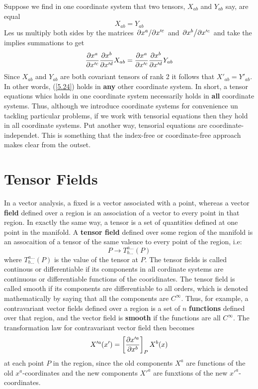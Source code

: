 Suppose we find in one coordinate system that two tensors, $X_{ab}$ and $Y_{ab}$ say, are equal 
\begin{equation}\label{5.24}
  X_{ab}=Y_{ab}
\end{equation}
Les us multiply both sides by the matrices $\pdv*{x^{a}}{x'^c}$ and $\pdv*{x^b}{x'^c}$ and take the implies summations to get
\begin{equation*}
  \pdv{x^{a}}{x'^c}\pdv{x^b}{x'^d}X_{ab}=\pdv{x^{a}}{x'^c}\pdv{x^b}{x'^d}Y_{ab}
\end{equation*}
Since $X_{ab}$ and $Y_{ab}$ are both covariant tensors of rank 2 it follows that $X'_{ab}=Y'_{ab}$. In other words, (\ref{5.24}) holds in \textbf{any} other coordinate system. In short, a tensor equations whics holds in one coordinate system necessarily holds in \textbf{all} coordinate systems. Thus, although we introduce coordinate systems for convenience un tackling particular problems, if we work with tensorial equations then they hold in all coordinate systems. Put another way, tensorial equations are coordinate-independet. This is something that the index-free or coordinate-free approach makes clear from the outset.

\section{Tensor Fields}
In a vector analysis, a fixed is a vector associated with a point, whereas a vector \textbf{field} defined over a region is an association of a vector to every point in that region. In exactly the same way, a tensor is a set of quantities defined at one point in the manifold. A \textbf{tensor field} defined over some region of the manifold is an assocaition of a tensor of the same valence to every point of the region, i.e: $$P\to T_{b...}^{a...}(P)$$ where $T_{b...}^{a...}(P)$ is the value of the tensor at $P$. The tensor fields is called continous or differentiable if its components in all cordinate systems are continuous  or differentiable functions of the cooridinates. The tensor field is called smooth if its components are differentiable to all orders, which is denoted mathematically by saying that all the components are $C^\infty$. Thus, for example, a contravariant vector fields defined over a region is a set of $n$ \textbf{functions} defined over that region, and the vector field is \textbf{smooth} if the functions are all $C^\infty$. The transformation law for contravariant vector field then becomes
\begin{equation}\label{5.25}
  X'^{a}(x')=\left[\pdv{x'^{a}}{x^b}\right]_PX^b(x)
\end{equation}
at each point $P$ in the region, since the old components $X^{a}$ are functions of the old $x^{a}$-coordinates and the new components $X'^{a}$ are funxtions of the new $x'^{a}$-coordinates.

